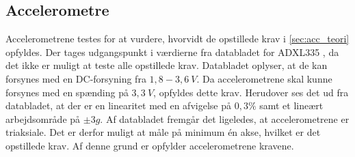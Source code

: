 \subsection{Accelerometre}

Accelerometrene testes for at vurdere, hvorvidt de opstillede krav i \autoref{sec:acc_teori} opfyldes. Der tages udgangspunkt i værdierne fra databladet for ADXL335 \citep{analogdevices2010}, da det ikke er muligt at teste alle opstillede krav. Databladet oplyser, at de kan forsynes med en DC-forsyning fra $1,8-3,6~V$. Da accelerometrene skal kunne forsynes med en spænding på $3,3~V$, opfyldes dette krav. Herudover ses det ud fra databladet, at der er en linearitet med en afvigelse på $0,3\%$ samt et lineært arbejdsområde på $ \pm 3 g$. Af databladet fremgår det ligeledes, at accelerometrene er triaksiale. Det er derfor muligt at måle på minimum én akse, hvilket er det opstillede krav. Af denne grund er opfylder accelerometrene kravene.  

